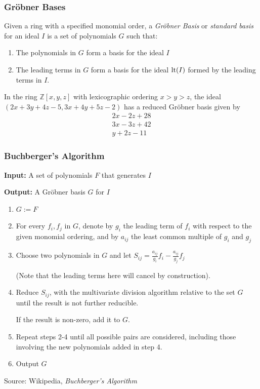 \documentclass{beamer}
\begin{document}
\begin{frame}
\frametitle{Gr\"obner Bases}
\begin{definition}
Given a ring with a specified monomial order,
a {\it Gr\"obner Basis} or {\it standard basis} for an ideal $I$ is a set of
polynomials $G$ such that:
\begin{enumerate}
\item The polynomials in $G$ form a basis for the ideal $I$
\item The leading terms in $G$ form a basis for the ideal ${\rm lt}(I)$ formed by the leading terms in $I$.
\end{enumerate}
\end{definition}

\begin{example}
In the ring ${\mathbb Z}[x,y,z]$ with lexicographic ordering $x>y>z$, the ideal $(2x+3y+4z-5, 3x+4y+5z-2)$
has a reduced Gr\"obner basis given by
\begin{align*}
2x-2z+28 \\
3x-3z+42 \\
y+2z-11
\end{align*}
\end{example}
\end{frame}

\begin{frame}
\frametitle{Buchberger's Algorithm}

{\bf Input:} A set of polynomials $F$ that generates $I$

{\bf Output:} A Gröbner basis $G$ for $I$

\begin{enumerate}
\item $G := F$
\item For every $f_i,f_j$ in $G$, denote by $g_i$ the leading term of $f_i$ with respect to the given monomial ordering,
and by $a_{ij}$ the least common multiple of $g_i$ and $g_j$
\item Choose two polynomials in $G$ and let $S_{ij}=\frac{a_{ij}}{g_i}f_i  - \frac{a_{ij}}{g_j}f_j $

(Note that the leading terms here will cancel by construction).
\item Reduce $S_{ij}$, with the multivariate division algorithm relative to the set $G$ until the result is not further reducible.

If the result is non-zero, add it to $G$.
\item Repeat steps 2-4 until all possible pairs are considered, including those involving the new polynomials added in step 4.
\item Output $G$
\end{enumerate}

Source: Wikipedia, {\it Buchberger's Algorithm}
\end{frame}
\end{document}
